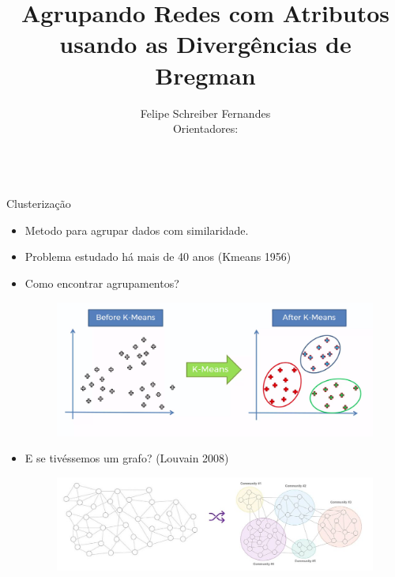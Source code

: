 \documentclass[aspectratio=169]{beamer}
\title{Agrupando Redes com Atributos usando as Divergências de Bregman}
\author{Felipe Schreiber Fernandes \\
    [1em]{Orientadores: \\
    \text{\hspace{2em}Daniel Ratton Figueiredo (UFRJ)}\\
    \text{\hspace{2em} Maximilien Dreveton (EPFL, Suíça)}}
}
\begin{document}
     \maketitle
     \begin{frame}{Clusterização}
     	\begin{itemize}
     		\item Metodo para agrupar dados com similaridade. 
     		\item Problema estudado há mais de 40 anos (Kmeans 1956)
     			\item Como encontrar agrupamentos? 
     			\begin{figure}
     				\centering
     				\includegraphics[scale=0.15]{img/kmeans.png}
     			\end{figure}
     			\item E se tivéssemos um grafo? (Louvain 2008)
     			\begin{figure}
     				\centering
     				\includegraphics[scale=0.15]{img/louvain.jpg}
     			\end{figure}
     	\end{itemize}
     \end{frame}
     
\end{document}
